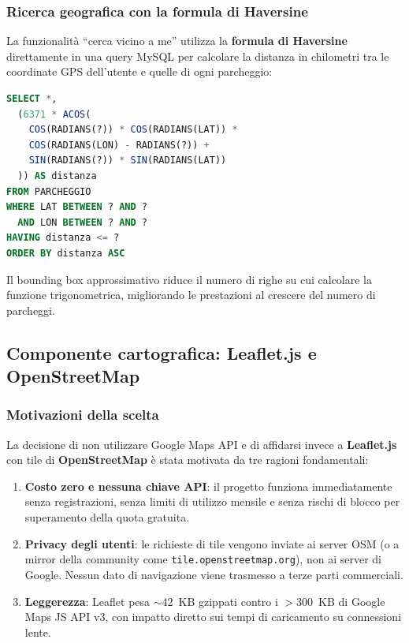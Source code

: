 \documentclass[12pt, a4paper]{article}
\begin{document}
\subsubsection{Ricerca geografica con la formula di Haversine}

La funzionalità ``cerca vicino a me'' utilizza la \textbf{formula di Haversine}
direttamente in una query MySQL per calcolare la distanza in chilometri tra le
coordinate GPS dell'utente e quelle di ogni parcheggio:

\begin{lstlisting}[language=SQL, caption={Ricerca geografica con Haversine e bounding box.}]
SELECT *,
  (6371 * ACOS(
    COS(RADIANS(?)) * COS(RADIANS(LAT)) *
    COS(RADIANS(LON) - RADIANS(?)) +
    SIN(RADIANS(?)) * SIN(RADIANS(LAT))
  )) AS distanza
FROM PARCHEGGIO
WHERE LAT BETWEEN ? AND ?
  AND LON BETWEEN ? AND ?
HAVING distanza <= ?
ORDER BY distanza ASC
\end{lstlisting}

Il bounding box approssimativo riduce il numero di righe su cui calcolare la funzione
trigonometrica, migliorando le prestazioni al crescere del numero di parcheggi.

\subsection{Componente cartografica: Leaflet.js e OpenStreetMap}

\subsubsection{Motivazioni della scelta}

La decisione di non utilizzare Google Maps API e di affidarsi invece a
\textbf{Leaflet.js} con tile di \textbf{OpenStreetMap} è stata motivata da tre
ragioni fondamentali:

\begin{enumerate}
    \item \textbf{Costo zero e nessuna chiave API}: il progetto funziona
    immediatamente senza registrazioni, senza limiti di utilizzo mensile e senza
    rischi di blocco per superamento della quota gratuita.

    \item \textbf{Privacy degli utenti}: le richieste di tile vengono inviate ai
    server OSM (o a mirror della community come \texttt{tile.openstreetmap.org}),
    non ai server di Google. Nessun dato di navigazione viene trasmesso a terze
    parti commerciali.

    \item \textbf{Leggerezza}: Leaflet pesa $\sim$42~KB gzippati contro i
    $>$300~KB di Google Maps JS API v3, con impatto diretto sui tempi di
    caricamento su connessioni lente.
\end{enumerate}
\end{document}
